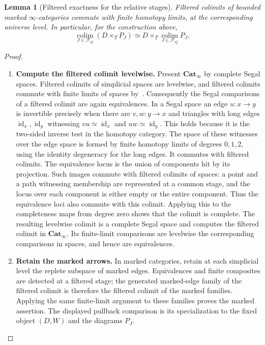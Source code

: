 \documentclass[oneside]{article}
\theoremstyle{plain}
\newtheorem{lemma}[theorem]{Lemma}
\theoremstyle{definition}
\theoremstyle{remark}
\newcommand{\Cat}{\mathbf{Cat}_{\infty}}
\newcommand{\id}{\operatorname{id}}
\begin{document}
\begin{lemma}[Filtered exactness for the relative stages]
\label{lem:filtered-marked-exactness}
Filtered colimits of bounded marked $\infty$-categories commute with
finite homotopy limits, at the corresponding universe level. In
particular, for the construction above,
\[
 \operatorname*{colim}_{J\in\mathcal F_Q}
       (D\times_TP_J)
 \simeq D\times_T
       \operatorname*{colim}_{J\in\mathcal F_Q}P_J.
\]
\end{lemma}
\begin{proof}
\leavevmode
\begin{enumerate}
\item \textbf{Compute the filtered colimit levelwise.}
Present $\Cat$ by complete Segal spaces. Filtered colimits of
simplicial spaces are levelwise, and filtered colimits commute with
finite limits of spaces by~\cite[Thm.~9.1.5.1]{Kerodon}.
Consequently the Segal comparisons of a filtered colimit are
again equivalences. In a Segal space an edge $u:x\to y$ is
invertible precisely when there are $v,w:y\to x$ and triangles
with long edges $\id_x,\id_y$ witnessing $vu\simeq\id_x$ and
$uw\simeq\id_y$. This holds because it is the two-sided inverse
test in the homotopy category. The space of these witnesses over
the edge space is formed by finite homotopy limits of degrees
$0,1,2$, using the identity degeneracy for the long edges.
It commutes with filtered colimits. The equivalence locus is the
union of components hit by its projection. Such images commute
with filtered colimits of spaces: a point and a path witnessing
membership are represented at a common stage, and the locus
over each component is either empty or the entire component.
Thus the equivalence loci also commute with this colimit.
Applying this to the completeness maps from degree zero shows
that the colimit is complete.
The resulting levelwise colimit is a complete Segal space and
computes the filtered colimit in $\Cat$. Its finite-limit
comparisons are levelwise the corresponding comparisons in spaces,
and hence are equivalences.


\item \textbf{Retain the marked arrows.}
In marked categories, retain at each simplicial level the replete
subspace of marked edges. Equivalences and finite composites are
detected at a filtered stage; the generated marked-edge family of
the filtered colimit is therefore the filtered colimit of the marked
families. Applying the same finite-limit argument to these families
proves the marked assertion. The displayed pullback comparison is its
specialization to the fixed object $(D,W)$ and the diagrams $P_J$.
\qedhere
\end{enumerate}
\end{proof}
\end{document}
